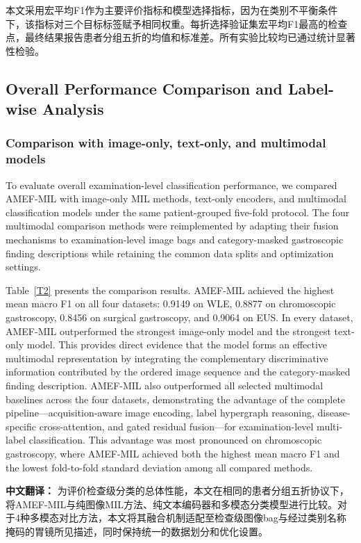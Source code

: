 \documentclass[Afour,sagev,times]{sagej}
\begin{document}
本文采用宏平均F1作为主要评价指标和模型选择指标，因为在类别不平衡条件下，该指标对三个目标标签赋予相同权重。每折选择验证集宏平均F1最高的检查点，最终结果报告患者分组五折的均值和标准差。所有实验比较均已通过统计显著性检验。

\subsection{Overall Performance Comparison and Label-wise Analysis}

\subsubsection{Comparison with image-only, text-only, and multimodal models}

To evaluate overall examination-level classification performance, we compared AMEF-MIL with image-only MIL methods, text-only encoders, and multimodal classification models under the same patient-grouped five-fold protocol. The four multimodal comparison methods were reimplemented by adapting their fusion mechanisms to examination-level image bags and category-masked gastroscopic finding descriptions while retaining the common data splits and optimization settings.\cite{R29,R30,R31,R32}

Table~\ref{T2} presents the comparison results. AMEF-MIL achieved the highest mean macro F1 on all four datasets: 0.9149 on WLE, 0.8877 on chromoscopic gastroscopy, 0.8456 on surgical gastroscopy, and 0.9064 on EUS. In every dataset, AMEF-MIL outperformed the strongest image-only model and the strongest text-only model. This provides direct evidence that the model forms an effective multimodal representation by integrating the complementary discriminative information contributed by the ordered image sequence and the category-masked finding description. AMEF-MIL also outperformed all selected multimodal baselines across the four datasets, demonstrating the advantage of the complete pipeline---acquisition-aware image encoding, label hypergraph reasoning, disease-specific cross-attention, and gated residual fusion---for examination-level multi-label classification. This advantage was most pronounced on chromoscopic gastroscopy, where AMEF-MIL achieved both the highest mean macro F1 and the lowest fold-to-fold standard deviation among all compared methods.

\textbf{中文翻译：} 为评价检查级分类的总体性能，本文在相同的患者分组五折协议下，将AMEF-MIL与纯图像MIL方法、纯文本编码器和多模态分类模型进行比较。对于4种多模态对比方法，本文将其融合机制适配至检查级图像bag与经过类别名称掩码的胃镜所见描述，同时保持统一的数据划分和优化设置。\cite{R29,R30,R31,R32}
\end{document}
